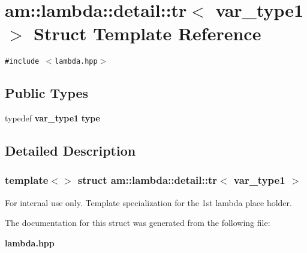 \section{am::lambda::detail::tr$<$ var\_\-type1 $>$ Struct Template Reference}
\label{structam_1_1lambda_1_1detail_1_1tr_3_01var__type1_01_4}
{\tt \#include $<$lambda.hpp$>$}

\subsection*{Public Types}
\begin{CompactItemize}
\item 
typedef {\bf var\_\-type1} \textbf{type}\label{structam_1_1lambda_1_1detail_1_1tr_3_01var__type1_01_4_2f07af356e0bb0d9d1b18d781b1a2b48}

\end{CompactItemize}


\subsection{Detailed Description}
\subsubsection*{template$<$$>$ struct am::lambda::detail::tr$<$ var\_\-type1 $>$}

\begin{Desc}
\item[For internal use only.]
Template specialization for the 1st lambda place holder. \end{Desc}




The documentation for this struct was generated from the following file:\begin{CompactItemize}
\item 
{\bf lambda.hpp}\end{CompactItemize}
